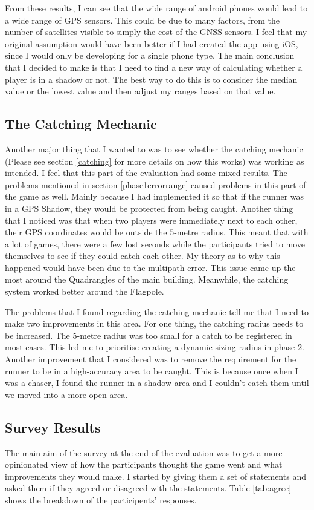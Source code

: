 \documentclass{l4proj}
\begin{document}
From these results, I can see that the wide range of android phones would lead to a wide range of GPS sensors. This could be due to many factors, from the number of satellites
visible to simply the cost of the GNSS sensors. I feel that my original assumption would have been better if I had created the app using iOS, since I would only be developing
for a single phone type. The main conclusion that I decided to make is that I need to find a new way of calculating whether a player is in a shadow or not.
The best way to do this is to consider the median value or the lowest value and then adjust my ranges based on that value.  

\subsection{The Catching Mechanic}
\label{phase1catching}
Another major thing that I wanted to was to see whether the catching mechanic (Please see section \ref{catching} for more details on how this works)
was working as intended. I feel that this part of the evaluation had some mixed results. The problems mentioned in section
\ref{phase1errorrange} caused problems in this part of the game as well. Mainly because I had implemented it so that if the
runner was in a GPS Shadow, they would be protected from being caught. Another thing that I noticed was that when two players
were immediately next to each other, their GPS coordinates would be outside the 5-metre radius. This meant that with a lot of
games, there were a few lost seconds while the participants tried to move themselves to see if they could catch each other.
My theory as to why this happened would have been due to the multipath error. This issue came up the most around the Quadrangles
of the main building. Meanwhile, the catching system worked better around the Flagpole.

The problems that I found regarding the catching mechanic tell me that I need to make two improvements in this area. For one
thing, the catching radius needs to be increased. The 5-metre radius was too small for a catch to be registered in most cases. This led
me to prioritise creating a dynamic sizing radius in phase 2. Another improvement that I considered was to remove the requirement for the runner to be in a high-accuracy area to be caught. 
This is because once when I was a chaser, I found the runner in a shadow area and I couldn't catch them until we moved into a more open area.

\subsection{Survey Results}
\label{phase1survey}
The main aim of the survey at the end of the evaluation was to get a more opinionated view of how the participants
thought the game went and what improvements they would make. I started by giving them a set of statements and asked
them if they agreed or disagreed with the statements. Table \ref{tab:agree} shows the breakdown of the participents'
responses.
\end{document}
